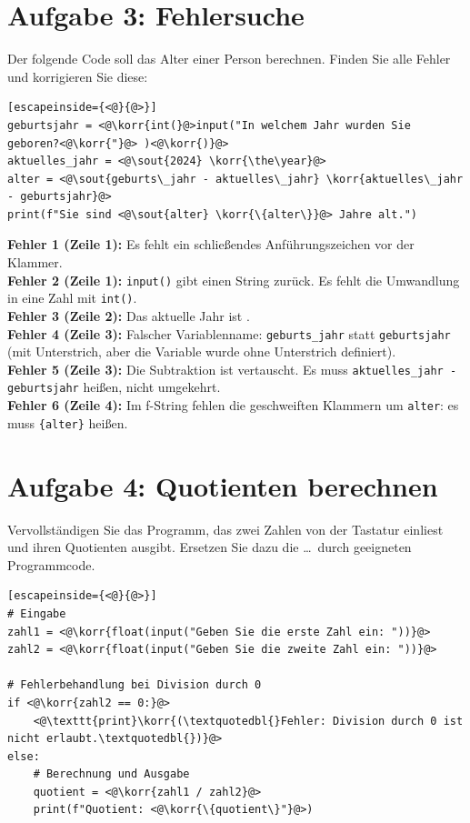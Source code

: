 \documentclass[ngerman,11pt]{article}
\newcommand{\korr}[1]{\textbf{\color{blue}#1}}
\begin{document}
\section*{Aufgabe 3: Fehlersuche}

Der folgende Code soll das Alter einer Person berechnen. Finden Sie alle Fehler und korrigieren Sie diese:

\begin{lstlisting}[escapeinside={<@}{@>}]
geburtsjahr = <@\korr{int(}@>input("In welchem Jahr wurden Sie geboren?<@\korr{"}@> )<@\korr{)}@>
aktuelles_jahr = <@\sout{2024} \korr{\the\year}@>
alter = <@\sout{geburts\_jahr - aktuelles\_jahr} \korr{aktuelles\_jahr - geburtsjahr}@>
print(f"Sie sind <@\sout{alter} \korr{\{alter\}}@> Jahre alt.")
\end{lstlisting}

\begin{loesung}
\color{blue}
\textbf{Fehler 1 (Zeile 1):} Es fehlt ein schließendes Anführungszeichen vor der Klammer.\\
\textbf{Fehler 2 (Zeile 1):} \texttt{input()} gibt einen String zurück. Es fehlt die Umwandlung in eine Zahl mit \texttt{int()}.\\
\textbf{Fehler 3 (Zeile 2):} Das aktuelle Jahr ist \the\year.\\
\textbf{Fehler 4 (Zeile 3):} Falscher Variablenname: \texttt{geburts\_jahr} statt \texttt{geburtsjahr} (mit Unterstrich, aber die Variable wurde ohne Unterstrich definiert).\\
\textbf{Fehler 5 (Zeile 3):} Die Subtraktion ist vertauscht. Es muss \texttt{aktuelles\_jahr - geburtsjahr} heißen, nicht umgekehrt.\\
\textbf{Fehler 6 (Zeile 4):} Im f-String fehlen die geschweiften Klammern um \texttt{alter}: es muss \texttt{\{alter\}} heißen.
\end{loesung}

\pagebreak

\section*{Aufgabe 4: Quotienten berechnen}
Vervollständigen Sie das Programm, das zwei Zahlen von der Tastatur einliest und ihren Quotienten ausgibt. Ersetzen Sie dazu die \ldots~durch geeigneten Programmcode.

\begin{lstlisting}[escapeinside={<@}{@>}]
# Eingabe
zahl1 = <@\korr{float(input("Geben Sie die erste Zahl ein: "))}@>
zahl2 = <@\korr{float(input("Geben Sie die zweite Zahl ein: "))}@>

# Fehlerbehandlung bei Division durch 0
if <@\korr{zahl2 == 0:}@>
    <@\texttt{print}\korr{(\textquotedbl{}Fehler: Division durch 0 ist nicht erlaubt.\textquotedbl{})}@>
else:
    # Berechnung und Ausgabe
    quotient = <@\korr{zahl1 / zahl2}@>
    print(f"Quotient: <@\korr{\{quotient\}"}@>)
\end{lstlisting}
\end{document}
